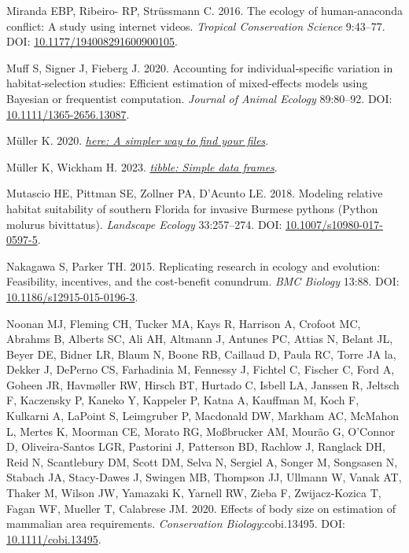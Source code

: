 \documentclass[10pt,a4paper]{article}
\newlength{\cslhangindent}
\newenvironment{CSLReferences}[2] %
 {\begin{list}{}{%
  \setlength{\itemindent}{0pt}
  \setlength{\leftmargin}{0pt}
  \setlength{\parsep}{0pt}
  \ifodd #1
   \setlength{\leftmargin}{\cslhangindent}
   \setlength{\itemindent}{-1\cslhangindent}
  \fi
  \setlength{\itemsep}{#2\baselineskip}}}
 {\end{list}}
\begin{document}
\begin{CSLReferences}{1}{0}
Miranda EBP, Ribeiro- RP, Strüssmann C. 2016. The ecology of human-anaconda conflict: A study using internet videos. \emph{Tropical Conservation Science} 9:43--77. DOI: \href{https://doi.org/10.1177/194008291600900105}{10.1177/194008291600900105}.

Muff S, Signer J, Fieberg J. 2020. Accounting for individual‐specific variation in habitat‐selection studies: {Efficient} estimation of mixed‐effects models using {Bayesian} or frequentist computation. \emph{Journal of Animal Ecology} 89:80--92. DOI: \href{https://doi.org/10.1111/1365-2656.13087}{10.1111/1365-2656.13087}.

Müller K. 2020. \emph{\href{https://CRAN.R-project.org/package=here}{{here}: A simpler way to find your files}}.

Müller K, Wickham H. 2023. \emph{\href{https://CRAN.R-project.org/package=tibble}{{tibble}: Simple data frames}}.

Mutascio HE, Pittman SE, Zollner PA, D'Acunto LE. 2018. Modeling relative habitat suitability of southern {Florida} for invasive {Burmese} pythons ({Python} molurus bivittatus). \emph{Landscape Ecology} 33:257--274. DOI: \href{https://doi.org/10.1007/s10980-017-0597-5}{10.1007/s10980-017-0597-5}.

Nakagawa S, Parker TH. 2015. Replicating research in ecology and evolution: Feasibility, incentives, and the cost-benefit conundrum. \emph{BMC Biology} 13:88. DOI: \href{https://doi.org/10.1186/s12915-015-0196-3}{10.1186/s12915-015-0196-3}.

Noonan MJ, Fleming CH, Tucker MA, Kays R, Harrison A, Crofoot MC, Abrahms B, Alberts SC, Ali AH, Altmann J, Antunes PC, Attias N, Belant JL, Beyer DE, Bidner LR, Blaum N, Boone RB, Caillaud D, Paula RC, Torre JA la, Dekker J, DePerno CS, Farhadinia M, Fennessy J, Fichtel C, Fischer C, Ford A, Goheen JR, Havmøller RW, Hirsch BT, Hurtado C, Isbell LA, Janssen R, Jeltsch F, Kaczensky P, Kaneko Y, Kappeler P, Katna A, Kauffman M, Koch F, Kulkarni A, LaPoint S, Leimgruber P, Macdonald DW, Markham AC, McMahon L, Mertes K, Moorman CE, Morato RG, Moßbrucker AM, Mourão G, O'Connor D, Oliveira‐Santos LGR, Pastorini J, Patterson BD, Rachlow J, Ranglack DH, Reid N, Scantlebury DM, Scott DM, Selva N, Sergiel A, Songer M, Songsasen N, Stabach JA, Stacy‐Dawes J, Swingen MB, Thompson JJ, Ullmann W, Vanak AT, Thaker M, Wilson JW, Yamazaki K, Yarnell RW, Zieba F, Zwijacz‐Kozica T, Fagan WF, Mueller T, Calabrese JM. 2020. Effects of body size on estimation of mammalian area requirements. \emph{Conservation Biology}:cobi.13495. DOI: \href{https://doi.org/10.1111/cobi.13495}{10.1111/cobi.13495}.


\end{CSLReferences}
\end{document}
